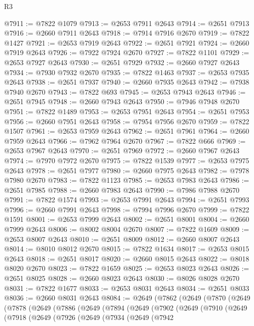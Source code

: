 \begin{lexlean}{R3}
\begin{coremodule}
@7911 := @7822 @1079
@7913 := @2653 @7911 @2643
@7914 := @2651 @7913
@7916 := @2660 @7911 @2643
@7918 := @7914 @7916 @2670
@7919 := @7822 @1427
@7921 := @2653 @7919 @2643
@7922 := @2651 @7921
@7924 := @2660 @7919 @2643
@7926 := @7922 @7924 @2670
@7927 := @7822 @1101
@7929 := @2653 @7927 @2643
@7930 := @2651 @7929
@7932 := @2660 @7927 @2643
@7934 := @7930 @7932 @2670
@7935 := @7822 @1463
@7937 := @2653 @7935 @2643
@7938 := @2651 @7937
@7940 := @2660 @7935 @2643
@7942 := @7938 @7940 @2670
@7943 := @7822 @693
@7945 := @2653 @7943 @2643
@7946 := @2651 @7945
@7948 := @2660 @7943 @2643
@7950 := @7946 @7948 @2670
@7951 := @7822 @1489
@7953 := @2653 @7951 @2643
@7954 := @2651 @7953
@7956 := @2660 @7951 @2643
@7958 := @7954 @7956 @2670
@7959 := @7822 @1507
@7961 := @2653 @7959 @2643
@7962 := @2651 @7961
@7964 := @2660 @7959 @2643
@7966 := @7962 @7964 @2670
@7967 := @7822 @666
@7969 := @2653 @7967 @2643
@7970 := @2651 @7969
@7972 := @2660 @7967 @2643
@7974 := @7970 @7972 @2670
@7975 := @7822 @1539
@7977 := @2653 @7975 @2643
@7978 := @2651 @7977
@7980 := @2660 @7975 @2643
@7982 := @7978 @7980 @2670
@7983 := @7822 @1123
@7985 := @2653 @7983 @2643
@7986 := @2651 @7985
@7988 := @2660 @7983 @2643
@7990 := @7986 @7988 @2670
@7991 := @7822 @1574
@7993 := @2653 @7991 @2643
@7994 := @2651 @7993
@7996 := @2660 @7991 @2643
@7998 := @7994 @7996 @2670
@7999 := @7822 @1591
@8001 := @2653 @7999 @2643
@8002 := @2651 @8001
@8004 := @2660 @7999 @2643
@8006 := @8002 @8004 @2670
@8007 := @7822 @1609
@8009 := @2653 @8007 @2643
@8010 := @2651 @8009
@8012 := @2660 @8007 @2643
@8014 := @8010 @8012 @2670
@8015 := @7822 @1634
@8017 := @2653 @8015 @2643
@8018 := @2651 @8017
@8020 := @2660 @8015 @2643
@8022 := @8018 @8020 @2670
@8023 := @7822 @1659
@8025 := @2653 @8023 @2643
@8026 := @2651 @8025
@8028 := @2660 @8023 @2643
@8030 := @8026 @8028 @2670
@8031 := @7822 @1677
@8033 := @2653 @8031 @2643
@8034 := @2651 @8033
@8036 := @2660 @8031 @2643
@8084 := @2649
    (@7862
      (@2649
        (@7870
          (@2649
            (@7878
              (@2649
                (@7886
                  (@2649
                    (@7894
                      (@2649
                        (@7902
                          (@2649
                            (@7910
                              (@2649
                                (@7918
                                  (@2649
                                    (@7926
                                      (@2649
                                        (@7934
                                          (@2649
                                            (@7942

\end{coremodule}
\end{lexlean}
